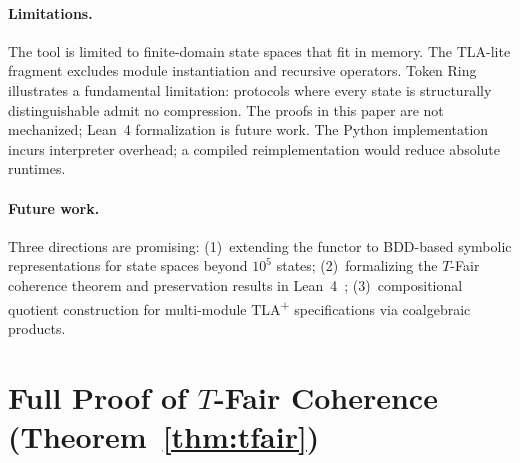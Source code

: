 \documentclass[11pt]{article}
\newcommand{\TFair}{$T$-Fair}
\newcommand{\TLAplus}{TLA\textsuperscript{+}}
\begin{document}
\paragraph{Limitations.}
The tool is limited to finite-domain state spaces that fit in memory.
The TLA-lite fragment excludes module instantiation and recursive operators.
Token Ring illustrates a fundamental limitation: protocols where every
state is structurally distinguishable admit no compression.
The proofs in this paper are not mechanized; Lean~4 formalization is
future work.
The Python implementation incurs interpreter overhead; a compiled
reimplementation would reduce absolute runtimes.

\paragraph{Future work.}
Three directions are promising:
(1)~extending the functor to BDD-based symbolic representations for state
spaces beyond $10^5$ states;
(2)~formalizing the \TFair{} coherence theorem and preservation results
in Lean~4~\cite{Lean4};
(3)~compositional quotient construction for multi-module \TLAplus{}
specifications via coalgebraic products.


\appendix

\section{Full Proof of \TFair{} Coherence (Theorem~\ref{thm:tfair})}
\label{app:tfair-proof}
\end{document}
